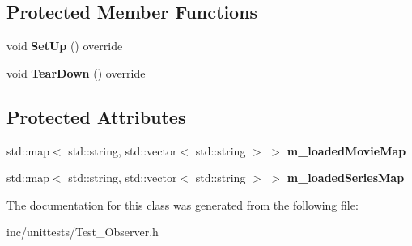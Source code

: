 \subsection*{Protected Member Functions}
\begin{DoxyCompactItemize}
\item 
\mbox{\label{classObserverTest_ab22192ebbb8dc2e7d6f29635108b803a}} 
void {\bfseries Set\+Up} () override
\item 
\mbox{\label{classObserverTest_a8bd0f5cd482a19feb01d8d659e34a4d1}} 
void {\bfseries Tear\+Down} () override
\end{DoxyCompactItemize}
\subsection*{Protected Attributes}
\begin{DoxyCompactItemize}
\item 
\mbox{\label{classObserverTest_a033a35884b4b765bf1da7b11b4aba26e}} 
std\+::map$<$ std\+::string, std\+::vector$<$ std\+::string $>$ $>$ {\bfseries m\+\_\+loaded\+Movie\+Map}
\item 
\mbox{\label{classObserverTest_accbfbd6967383c6982fe603c077764bb}} 
std\+::map$<$ std\+::string, std\+::vector$<$ std\+::string $>$ $>$ {\bfseries m\+\_\+loaded\+Series\+Map}
\end{DoxyCompactItemize}


The documentation for this class was generated from the following file\+:\begin{DoxyCompactItemize}
\item 
inc/unittests/Test\+\_\+\+Observer.\+h\end{DoxyCompactItemize}
